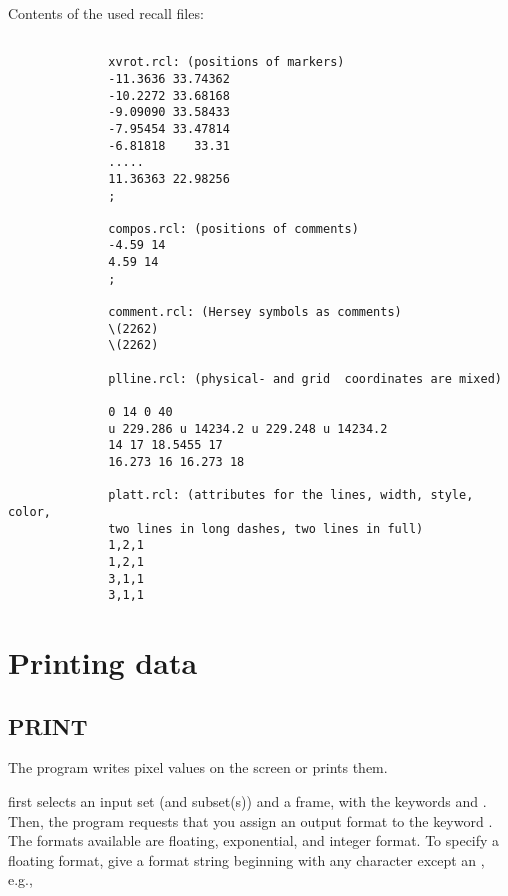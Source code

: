               Contents of the used recall files: 

\begin{verbatim}
            
              xvrot.rcl: (positions of markers)
              -11.3636 33.74362
              -10.2272 33.68168
              -9.09090 33.58433
              -7.95454 33.47814
              -6.81818    33.31
              .....
              11.36363 22.98256
              ;
              
              compos.rcl: (positions of comments)
              -4.59 14
              4.59 14 
              ;

              comment.rcl: (Hersey symbols as comments)
              \(2262)
              \(2262)
              
              plline.rcl: (physical- and grid  coordinates are mixed)
              
              0 14 0 40
              u 229.286 u 14234.2 u 229.248 u 14234.2
              14 17 18.5455 17
              16.273 16 16.273 18 
              
              platt.rcl: (attributes for the lines, width, style, color,
              two lines in long dashes, two lines in full)              
              1,2,1
              1,2,1
              3,1,1
              3,1,1  

\end{verbatim}






\section{Printing data}

\subsection*{PRINT}

The program  writes pixel values on the screen or prints
them. 

 first selects an input set (and subset(s)) and a frame,
with the keywords  and .  Then, the
program requests that you  assign an output format to the keyword
.  The formats available are floating, exponential, and
integer format.  To specify a floating format, give a format string
beginning with any character except an , e.g.,

